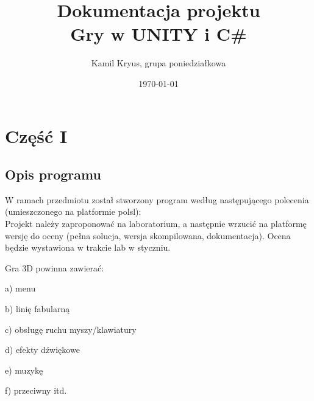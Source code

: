 \documentclass[12pt,a4paper]{article}
\begin{document}
	
	\title{Dokumentacja projektu\\ Gry w UNITY i C\#}
	\author{Kamil Kryus, grupa poniedziałkowa}
	\date{\today}
	
	\maketitle
	\newpage
	\section*{Część I}
	\subsection*{Opis programu}
	W ramach przedmiotu został stworzony program według następującego polecenia (umieszczonego na platformie polsl): \\
	Projekt należy zaproponować na laboratorium, a następnie wrzucić na platformę wersję do oceny (pełna solucja, wersja skompilowana, dokumentacja). Ocena będzie wystawiona w trakcie lab w styczniu.

Gra 3D powinna zawierać:

a) menu

b) linię fabularną

c) obsługę ruchu myszy/klawiatury

d) efekty dźwiękowe

e) muzykę

f) przeciwny itd.
\end{document}
